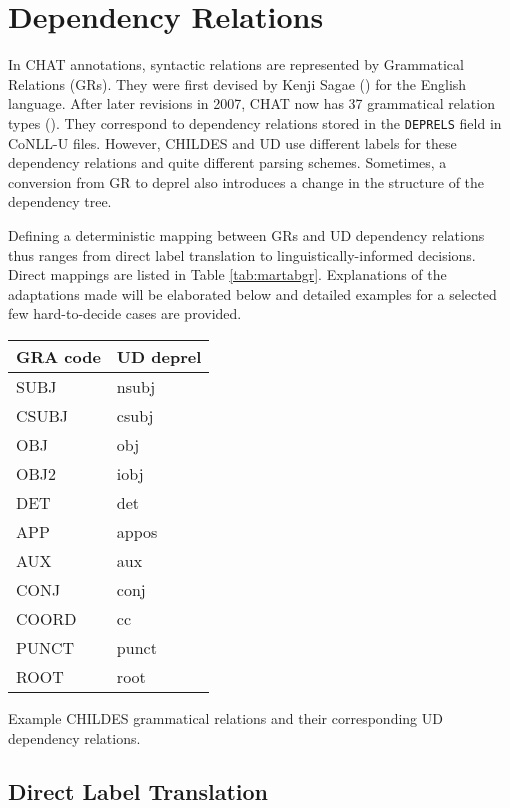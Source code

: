 \section{Dependency Relations}
\label{sec:deprel}

In CHAT annotations, syntactic relations are represented by Grammatical Relations (GRs). They were first devised by Kenji Sagae (\cite{sagae-etal-2004-adding}) for the English language. After later revisions in 2007, CHAT now has 37 grammatical relation types (\cite{sagae2007}). They correspond to dependency relations stored in the \texttt{DEPRELS} field in CoNLL-U files. However, CHILDES and UD use different labels for these dependency relations and quite different parsing schemes. Sometimes, a conversion from GR to deprel also introduces a change in the structure of the dependency tree.

Defining a deterministic mapping between GRs and UD dependency relations thus ranges from direct label translation to linguistically-informed decisions. Direct mappings are listed in Table \ref{tab:martabgr}. Explanations of the adaptations made will be elaborated below and detailed examples for a selected few hard-to-decide cases are provided.

\begin{margintable}[1\baselineskip]
\begin{tabularx}{1\textwidth}{@{}Ll@{}}
\toprule
\textbf{GRA code} & \textbf{UD deprel}\\ \midrule
SUBJ & nsubj\\
CSUBJ & csubj\\
OBJ & obj\\
OBJ2 & iobj\\
DET & det\\
APP & appos\\
AUX & aux\\
CONJ & conj\\
COORD & cc\\
PUNCT & punct\\
ROOT & root\\\bottomrule
\end{tabularx}
\caption{\label{tab:martabgr}Example CHILDES grammatical relations and their corresponding UD dependency relations.}
\footnotesize
\end{margintable}

\subsection{Direct Label Translation}


